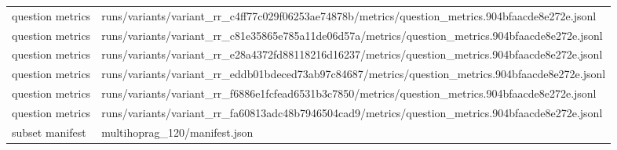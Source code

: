 \begin{tabular}{ll}
question metrics & runs/variants/variant_rr_c4ff77c029f06253ae74878b/metrics/question_metrics.904bfaacde8e272e.jsonl \\
question metrics & runs/variants/variant_rr_c81e35865e785a11de06d57a/metrics/question_metrics.904bfaacde8e272e.jsonl \\
question metrics & runs/variants/variant_rr_e28a4372fd88118216d16237/metrics/question_metrics.904bfaacde8e272e.jsonl \\
question metrics & runs/variants/variant_rr_eddb01bdeced73ab97c84687/metrics/question_metrics.904bfaacde8e272e.jsonl \\
question metrics & runs/variants/variant_rr_f6886e1fcfead6531b3c7850/metrics/question_metrics.904bfaacde8e272e.jsonl \\
question metrics & runs/variants/variant_rr_fa60813adc48b7946504cad9/metrics/question_metrics.904bfaacde8e272e.jsonl \\
subset manifest & multihoprag_120/manifest.json \\
\bottomrule
\end{tabular}
